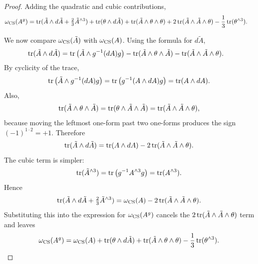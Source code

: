\begin{proof}
\medskip

\noindent Adding the quadratic and cubic contributions,
\begin{align*}
\omega_{\operatorname{CS}}(A^g)
&= \operatorname{tr}(\tilde A\wedge d\tilde A + \tfrac{2}{3}\tilde A^{\wedge 3})
 + \operatorname{tr}(\theta\wedge d\tilde A)
 + \operatorname{tr}(\tilde A\wedge\theta\wedge\theta)
 + 2\operatorname{tr}(\tilde A\wedge\tilde A\wedge\theta)
 - \frac{1}{3}\operatorname{tr}(\theta^{\wedge 3}).
\end{align*}

\medskip

\noindent We now compare $\omega_{\operatorname{CS}}(\tilde A)$ with $\omega_{\operatorname{CS}}(A)$. Using the formula for $d\tilde A$,
\begin{align*}
\operatorname{tr}(\tilde A\wedge d\tilde A)
&= \operatorname{tr}\left(\tilde A\wedge g^{-1}(dA)g\right)
 - \operatorname{tr}(\tilde A\wedge\theta\wedge\tilde A)
 - \operatorname{tr}(\tilde A\wedge\tilde A\wedge\theta).
\end{align*}
By cyclicity of the trace,
\begin{equation*}
\operatorname{tr}\left(\tilde A\wedge g^{-1}(dA)g\right)
= \operatorname{tr}\left(g^{-1}(A\wedge dA)g\right)
= \operatorname{tr}(A\wedge dA).
\end{equation*}
Also,
\begin{equation*}
\operatorname{tr}(\tilde A\wedge\theta\wedge\tilde A)
= \operatorname{tr}(\theta\wedge\tilde A\wedge\tilde A)
= \operatorname{tr}(\tilde A\wedge\tilde A\wedge\theta),
\end{equation*}
because moving the leftmost one-form past two one-forms produces the sign $(-1)^{1\cdot 2}=+1$. Therefore
\begin{equation*}
\operatorname{tr}(\tilde A\wedge d\tilde A)
= \operatorname{tr}(A\wedge dA) - 2\operatorname{tr}(\tilde A\wedge\tilde A\wedge\theta).
\end{equation*}
The cubic term is simpler:
\begin{equation*}
\operatorname{tr}(\tilde A^{\wedge 3})
= \operatorname{tr}\left(g^{-1}A^{\wedge 3}g\right)
= \operatorname{tr}(A^{\wedge 3}).
\end{equation*}
Hence
\begin{equation*}
\operatorname{tr}(\tilde A\wedge d\tilde A + \tfrac{2}{3}\tilde A^{\wedge 3})
= \omega_{\operatorname{CS}}(A) - 2\operatorname{tr}(\tilde A\wedge\tilde A\wedge\theta).
\end{equation*}
Substituting this into the expression for $\omega_{\operatorname{CS}}(A^g)$ cancels the $2\operatorname{tr}(\tilde A\wedge\tilde A\wedge\theta)$ term and leaves
\begin{equation*}
\omega_{\operatorname{CS}}(A^g)
= \omega_{\operatorname{CS}}(A)
 + \operatorname{tr}(\theta\wedge d\tilde A)
 + \operatorname{tr}(\tilde A\wedge\theta\wedge\theta)
 - \frac{1}{3}\operatorname{tr}(\theta^{\wedge 3}).
\end{equation*}


\end{proof}
